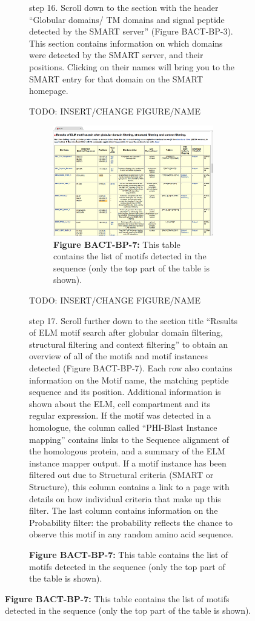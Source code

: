 {\begin{figure}[h!]
{{\begin{figure}[h!]
{{step 16. Scroll down to the section with the header ``Globular domains/
TM domains and signal peptide detected by the SMART server'' (Figure
BACT-BP-3). This section contains information on which domains were
detected by the SMART server, and their positions. Clicking on their
names will bring you to the SMART entry for that domain on the SMART
homepage.

TODO: INSERT/CHANGE FIGURE/NAME

\begin{figure}[h!]
\centering
\includegraphics[width=\textwidth]{Figures/TP53_1/elm_results_motifs.png}
\caption{
\textbf{Figure BACT-BP-7:} This table contains the list of motifs
detected in the sequence (only the top part of the table is shown).
}
\end{figure}

TODO: INSERT/CHANGE FIGURE/NAME

step 17. Scroll further down to the section title ``Results of ELM motif
search after globular domain filtering, structural filtering and context
filtering'' to obtain an overview of all of the motifs and motif
instances detected (Figure BACT-BP-7). Each row also contains
information on the Motif name, the matching peptide sequence and its
position. Additional information is shown about the ELM, cell
compartment and its regular expression. If the motif was detected in a
homologue, the column called ``PHI-Blast Instance mapping'' contains
links to the Sequence alignment of the homologous protein, and a summary
of the ELM instance mapper output. If a motif instance has been filtered
out due to Structural criteria (SMART or Structure), this column
contains a link to a page with details on how individual criteria that
make up this filter. The last column contains information on the
Probability filter: the probability reflects the chance to observe this
motif in any random amino acid sequence.

}}
\end{figure}}}
\end{figure}}
